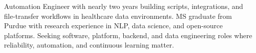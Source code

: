 \documentclass[11pt, letterpaper]{awesome-cv}
\begin{document}
\makecvheader

\begin{cvparagraph}
Automation Engineer with nearly two years building scripts, integrations, and file-transfer workflows in healthcare data environments. MS graduate from Purdue with research experience in NLP, data science, and open-source platforms. Seeking software, platform, backend, and data engineering roles where reliability, automation, and continuous learning matter.
\end{cvparagraph}






\end{document}
